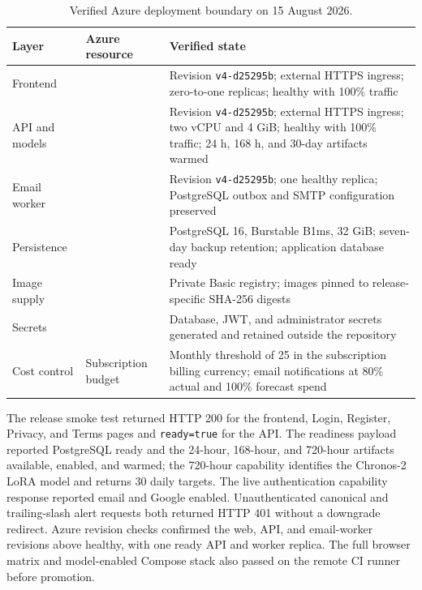 \begin{table}[H]
\centering
\caption{Verified Azure deployment boundary on 15 August 2026.}
\label{tab:azuredeployment}
\begin{tabularx}{\textwidth}{p{}p{}Y}
\toprule
Layer & Azure resource & Verified state \\
\midrule
Frontend &  & Revision \texttt{v4-d25295b}; external HTTPS ingress; zero-to-one replicas; healthy with 100\% traffic \\
API and models &  & Revision \texttt{v4-d25295b}; external HTTPS ingress; two vCPU and 4 GiB; healthy with 100\% traffic; 24 h, 168 h, and 30-day artifacts warmed \\
Email worker &  & Revision \texttt{v4-d25295b}; one healthy replica; PostgreSQL outbox and SMTP configuration preserved \\
Persistence &  & PostgreSQL 16, Burstable B1ms, 32 GiB; seven-day backup retention; application database ready \\
Image supply &  & Private Basic registry; images pinned to release-specific SHA-256 digests \\
Secrets &  & Database, JWT, and administrator secrets generated and retained outside the repository \\
Cost control & Subscription budget & Monthly threshold of 25 in the subscription billing currency; email notifications at 80\% actual and 100\% forecast spend \\
\bottomrule
\end{tabularx}
\end{table}

The release smoke test returned HTTP 200 for the frontend, Login, Register, Privacy, and Terms pages and \texttt{ready=true} for the API. The readiness payload reported PostgreSQL ready and the 24-hour, 168-hour, and 720-hour artifacts available, enabled, and warmed; the 720-hour capability identifies the Chronos-2 LoRA model and returns 30 daily targets. The live authentication capability response reported email and Google enabled. Unauthenticated canonical and trailing-slash alert requests both returned HTTP 401 without a downgrade redirect. Azure revision checks confirmed the web, API, and email-worker revisions above healthy, with one ready API and worker replica. The full browser matrix and model-enabled Compose stack also passed on the remote CI runner before promotion.


